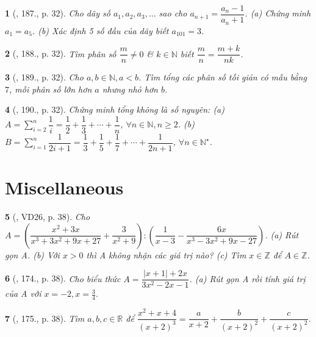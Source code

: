 \documentclass{article}
\newtheorem{baitoan}{}
\begin{document}
\begin{baitoan}[\cite{Binh_Toan_8_tap_1}, 187., p. 32]
	Cho dãy số $a_1,a_2,a_3,\ldots$ sao cho $a_{n+1} = \dfrac{a_n - 1}{a_n + 1}$. (a) Chứng minh $a_1 = a_5$. (b) Xác định 5 số đầu của dãy biết $a_{101} = 3$.
\end{baitoan}

\begin{baitoan}[\cite{Binh_Toan_8_tap_1}, 188., p. 32]
	Tìm phân số $\dfrac{m}{n}\ne0$ \& $k\in\mathbb{N}$ biết $\dfrac{m}{n} = \dfrac{m + k}{nk}$.
\end{baitoan}

\begin{baitoan}[\cite{Binh_Toan_8_tap_1}, 189., p. 32]
	Cho $a,b\in\mathbb{N},a < b$. Tìm tổng các phân số tối giản có mẫu bằng $7$, mỗi phân số lớn hơn $a$ nhưng nhỏ hơn $b$.
\end{baitoan}

\begin{baitoan}[\cite{Binh_Toan_8_tap_1}, 190., p. 32]
	Chứng minh tổng không là số nguyên: (a) $A = \sum_{i=2}^n \dfrac{1}{i} = \dfrac{1}{2} + \dfrac{1}{3} + \cdots + \dfrac{1}{n}$, $\forall n\in\mathbb{N},n\ge2$. (b) $B = \sum_{i=1}^n \dfrac{1}{2i + 1} = \dfrac{1}{3} + \dfrac{1}{5} + \dfrac{1}{7} + \cdots + \dfrac{1}{2n + 1}$, $\forall n\in\mathbb{N}^\star$.
\end{baitoan}


\section{Miscellaneous}

\begin{baitoan}[\cite{Tuyen_Toan_8}, VD26, p. 38]
	Cho $A = \left(\dfrac{x^2 + 3x}{x^3 + 3x^2 + 9x + 27} + \dfrac{3}{x^2 + 9}\right):\left(\dfrac{1}{x - 3} - \dfrac{6x}{x^3 - 3x^2 + 9x - 27}\right)$. (a) Rút gọn A. (b) Với $x > 0$ thì A không nhận các giá trị nào? (c) Tìm $x\in\mathbb{Z}$ để $A\in\mathbb{Z}$.
\end{baitoan}

\begin{baitoan}[\cite{Tuyen_Toan_8}, 174., p. 38]
	Cho biểu thức $A = \dfrac{|x + 1| + 2x}{3x^2 - 2x - 1}$. (a) Rút gọn A rồi tính giá trị của A với $x = -2,x = \frac{3}{4}$.
\end{baitoan}

\begin{baitoan}[\cite{Tuyen_Toan_8}, 175., p. 38]
	Tìm $a,b,c\in\mathbb{R}$ để $\dfrac{x^2 + x + 4}{(x + 2)^3} = \dfrac{a}{x + 2} + \dfrac{b}{(x + 2)^2} + \dfrac{c}{(x + 2)^2}$.
\end{baitoan}
\end{document}
